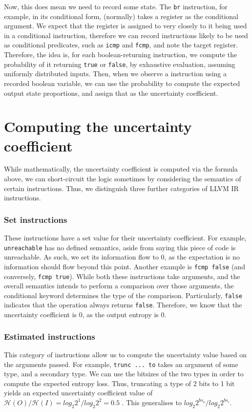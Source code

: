 \documentclass[a4paper]{article}
\newcommand{\entropy}[1]{\mathcal{H}(#1)}
\newcommand{\inst}[1]{\texttt{#1}}
\newcommand{\cmnt}[2]{{\color{red}{\textbf{#1:} #2}}}
\newcommand{\AL}[1]{\cmnt{AL}{#1}}
\begin{document}
Now, this does mean we need to record some state. The \inst{br} instruction,
for example, in its conditional form, (normally) takes a register as the
conditional argument. We expect that the register is assigned to very closely
to it being used in a conditional instruction, therefore we can record
instructions likely to be used as conditional predicates, such as \inst{icmp}
and \inst{fcmp}, and note the target register. Therefore, the idea is, for each
boolean-returning instruction, we compute the probability of it returning
\texttt{true} or \texttt{false}, by exhaustive evaluation, assuming uniformly
distributed inputs. Then, when we observe a instruction using a recorded
boolean variable, we can use the probability to compute the expected output
state proportions, and assign that as the uncertainty coefficient.

\section{Computing the uncertainty coefficient}
While mathematically, the uncertainty coefficient is computed via the formula
above, we can short-circuit the logic sometimes by considering the semantics of
certain instructions. Thus, we distinguish three further categories of LLVM IR
instructions.

\subsubsection*{Set instructions}
These instructions have a set value for their uncertainty coefficient. For
example, \inst{unreachable} has no defined semantics, aside from saying this
piece of code is unreachable. As such, we set its information flow to 0, as the
expectation is no information should flow beyond this point. Another example is
\inst{fcmp false} (and conversely, \inst{fcmp true}). While both these
instructions take arguments, and the overall semantics intends to perform a
comparison over those arguments, the conditional keyword determines the type of
the comparison. Particularly, \texttt{false} indicates that the operation
always returns \texttt{false}. Therefore, we know that the uncertainty
coefficient is 0, as the output entropy is 0. \AL{Double check}

\subsubsection*{Estimated instructions}
This category of instructions allow us to compute the uncertainty value based
on the arguments passed. For example, \texttt{trunc ... to} takes an argument
of some type, and a secondary type. We can use the bitsizes of the two types in
order to compute the expected entropy loss. Thus, truncating a type of 2 bits
to 1 bit yields an expected uncertainty coefficient value of \(\entropy{O} /
\entropy{I} = log_2{2^1} / log_2{2^2} = 0.5\) \AL{Double check}. This
generalises to \(log_2{2^{bs_o}} / log_2{2^{bs_i}}\).
\end{document}
